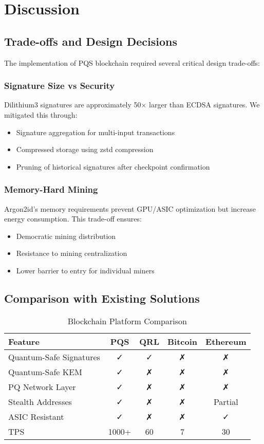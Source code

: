 \documentclass[12pt,a4paper]{article}
\begin{document}
\section{Discussion}

\subsection{Trade-offs and Design Decisions}

The implementation of PQS blockchain required several critical design trade-offs:

\subsubsection{Signature Size vs Security}
Dilithium3 signatures are approximately 50× larger than ECDSA signatures. We mitigated this through:
\begin{itemize}
\item Signature aggregation for multi-input transactions
\item Compressed storage using zstd compression
\item Pruning of historical signatures after checkpoint confirmation
\end{itemize}

\subsubsection{Memory-Hard Mining}
Argon2id's memory requirements prevent GPU/ASIC optimization but increase energy consumption. This trade-off ensures:
\begin{itemize}
\item Democratic mining distribution
\item Resistance to mining centralization
\item Lower barrier to entry for individual miners
\end{itemize}

\subsection{Comparison with Existing Solutions}

\begin{table}[h]
\centering
\begin{tabular}{@{}lcccc@{}}
\toprule
\textbf{Feature} & \textbf{PQS} & \textbf{QRL} & \textbf{Bitcoin} & \textbf{Ethereum} \\ \midrule
Quantum-Safe Signatures & ✓ & ✓ & ✗ & ✗ \\
Quantum-Safe KEM & ✓ & ✗ & ✗ & ✗ \\
PQ Network Layer & ✓ & ✗ & ✗ & ✗ \\
Stealth Addresses & ✓ & ✗ & ✗ & Partial \\
ASIC Resistant & ✓ & ✗ & ✗ & ✓ \\
TPS & 1000+ & 60 & 7 & 30 \\
\bottomrule
\end{tabular}
\caption{Blockchain Platform Comparison}
\end{table}
\end{document}

